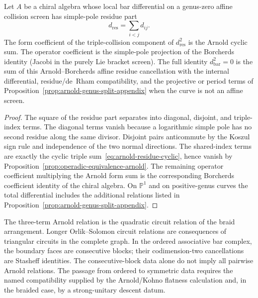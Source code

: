 \begin{theorem}
\label{thm:bar-d-squared-arnold}
Let $A$ be a chiral algebra whose local bar differential on a
genus-zero affine collision screen has simple-pole residue part
\[
d_{\mathrm{res}}=\sum_{i<j} d_{ij}.
\]
The form coefficient of the triple-collision component of
$d_{\mathrm{res}}^2$ is the Arnold cyclic sum. The operator coefficient
is the simple-pole projection of the Borcherds identity \textup{(}Jacobi
in the purely Lie bracket screen\textup{)}. The full identity
$d_{\mathrm{bar}}^2=0$ is the sum of this Arnold--Borcherds affine
residue cancellation with the internal differential, residue/de~Rham
compatibility, and the projective or period terms of
Proposition~\ref{prop:arnold-genus-split-appendix} when the curve is
not an affine screen.
\end{theorem}

\begin{proof}
The square of the residue part separates into diagonal, disjoint, and
triple-index terms. The diagonal terms vanish because a logarithmic
simple pole has no second residue along the same divisor. Disjoint
pairs anticommute by the Koszul sign rule and independence of the two
normal directions. The shared-index terms are exactly the cyclic
triple sum~\eqref{eq:arnold-residue-cyclic}, hence vanish by
Proposition~\ref{prop:operadic-equivalence-arnold}. The remaining
operator coefficient multiplying the Arnold form sum is the corresponding
Borcherds coefficient identity of the chiral algebra. On
$\mathbb{P}^1$ and on positive-genus curves the total differential
includes the additional relations listed in
Proposition~\ref{prop:arnold-genus-split-appendix}.
\end{proof}

\begin{remark}
The three-term Arnold relation is the quadratic circuit relation of
the braid arrangement. Longer Orlik--Solomon circuit relations are
consequences of triangular circuits in the complete graph. In the
ordered associative bar complex, the boundary faces are consecutive
blocks; their codimension-two cancellations are Stasheff identities.
The consecutive-block data alone do not imply all pairwise Arnold
relations. The passage from ordered to symmetric data requires the
named compatibility supplied by the Arnold/Kohno flatness calculation
and, in the braided case, by a strong-unitary descent datum.
\end{remark}

